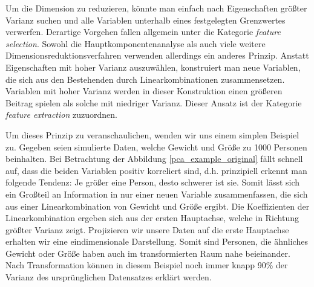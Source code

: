 Um die Dimension zu reduzieren, könnte man einfach nach Eigenschaften größter Varianz suchen und alle Variablen unterhalb eines festgelegten Grenzwertes verwerfen. Derartige Vorgehen fallen allgemein unter die Kategorie \textit{feature selection}. Sowohl die Hauptkomponentenanalyse als auch viele weitere Dimensionsreduktionsverfahren verwenden allerdings ein anderes Prinzip. Anstatt Eigenschaften mit hoher Varianz auszuwählen, konstruiert man neue Variablen, die sich aus den Bestehenden durch Linearkombinationen zusammensetzen. Variablen mit hoher Varianz werden in dieser Konstruktion einen größeren Beitrag spielen als solche mit niedriger Varianz. Dieser Ansatz ist der Kategorie \textit{feature extraction} zuzuordnen.

Um dieses Prinzip zu veranschaulichen, wenden wir uns einem simplen Beispiel zu. Gegeben seien simulierte Daten, welche Gewicht und Größe zu 1000 Personen beinhalten. Bei Betrachtung der Abbildung \ref{pca_example_original} fällt schnell auf, dass die beiden Variablen positiv korreliert sind, d.h. prinzipiell erkennt man folgende Tendenz: Je größer eine Person, desto schwerer ist sie. Somit lässt sich ein Großteil an Information in nur einer neuen Variable zusammenfassen, die sich aus einer Linearkombination von Gewicht und Größe ergibt. Die Koeffizienten der Linearkombination ergeben sich aus der ersten Hauptachse, welche in Richtung größter Varianz zeigt. Projizieren wir unsere Daten auf die erste Hauptachse erhalten wir eine eindimensionale Darstellung. Somit sind Personen, die ähnliches Gewicht oder Größe haben auch im transformierten Raum nahe beieinander. Nach Transformation können in diesem Beispiel noch immer knapp 90\% der Varianz des ursprünglichen Datensatzes erklärt werden.

